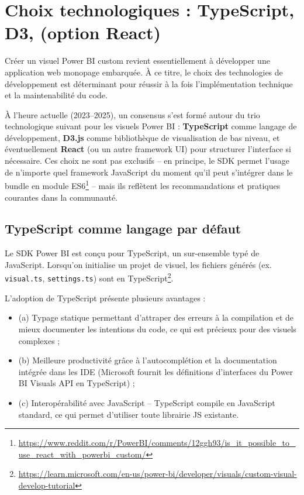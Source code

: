 \section{Choix technologiques : TypeScript, D3, (option React)}
\label{sec:choix-technologiques}

Créer un visuel Power BI custom revient essentiellement à développer une application web monopage embarquée. À ce titre, le choix des technologies de développement est déterminant pour réussir à la fois l’implémentation technique et la maintenabilité du code.

À l’heure actuelle (2023–2025), un consensus s’est formé autour du trio technologique suivant pour les visuels Power BI : \textbf{TypeScript} comme langage de développement, \textbf{D3.js} comme bibliothèque de visualisation de bas niveau, et éventuellement \textbf{React} (ou un autre framework UI) pour structurer l’interface si nécessaire. Ces choix ne sont pas exclusifs – en principe, le SDK permet l’usage de n’importe quel framework JavaScript du moment qu’il peut s’intégrer dans le bundle en module ES6\footnote{\url{https://www.reddit.com/r/PowerBI/comments/12ggh93/is_it_possible_to_use_react_with_powerbi_custom/}} – mais ils reflètent les recommandations et pratiques courantes dans la communauté.

\subsection{TypeScript comme langage par défaut}

Le SDK Power BI est conçu pour TypeScript, un sur-ensemble typé de JavaScript. Lorsqu’on initialise un projet de visuel, les fichiers générés (ex. \texttt{visual.ts}, \texttt{settings.ts}) sont en TypeScript\footnote{\url{https://learn.microsoft.com/en-us/power-bi/developer/visuals/custom-visual-develop-tutorial}}.

L’adoption de TypeScript présente plusieurs avantages :
\begin{itemize}
  \item (a) Typage statique permettant d’attraper des erreurs à la compilation et de mieux documenter les intentions du code, ce qui est précieux pour des visuels complexes ;
  \item (b) Meilleure productivité grâce à l’autocomplétion et la documentation intégrée dans les IDE (Microsoft fournit les définitions d’interfaces du Power BI Visuals API en TypeScript) ;
  \item (c) Interopérabilité avec JavaScript – TypeScript compile en JavaScript standard, ce qui permet d’utiliser toute librairie JS existante.
\end{itemize}

